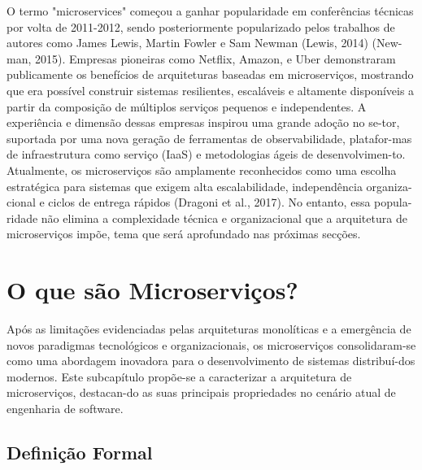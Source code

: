 O termo "microservices" começou a ganhar popularidade em conferências técnicas por volta de 2011-2012, sendo posteriormente popularizado pelos trabalhos de autores como James Lewis, Martin Fowler e Sam Newman (Lewis, 2014) (New-man, 2015). Empresas pioneiras como Netflix, Amazon, e Uber demonstraram publicamente os benefícios de arquiteturas baseadas em microserviços, mostrando que era possível construir sistemas resilientes, escaláveis e altamente disponíveis a partir da composição de múltiplos serviços pequenos e independentes.
A experiência e dimensão dessas empresas inspirou uma grande adoção no se-tor, suportada por uma nova geração de ferramentas de observabilidade, platafor-mas de infraestrutura como serviço (IaaS) e metodologias ágeis de desenvolvimen-to.
Atualmente, os microserviços são amplamente reconhecidos como uma escolha estratégica para sistemas que exigem alta escalabilidade, independência organiza-cional e ciclos de entrega rápidos (Dragoni et al., 2017). No entanto, essa popula-ridade não elimina a complexidade técnica e organizacional que a arquitetura de microserviços impõe, tema que será aprofundado nas próximas secções.

\section{O que são Microserviços?}

Após as limitações evidenciadas pelas arquiteturas monolíticas e a emergência de novos paradigmas tecnológicos e organizacionais, os microserviços consolidaram-se como uma abordagem inovadora para o desenvolvimento de sistemas distribuí-dos modernos.
Este subcapítulo propõe-se a caracterizar a arquitetura de microserviços, destacan-do as suas principais propriedades no cenário atual de engenharia de software.

\subsection{Definição Formal}

